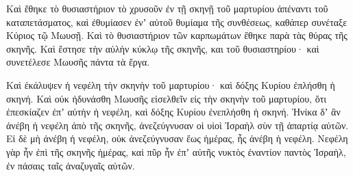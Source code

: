 {Καὶ ἔθηκε τὸ θυσιαστήριον τὸ χρυσοῦν ἐν τῇ σκηνῇ τοῦ μαρτυρίου ἀπέναντι τοῦ καταπετάσματος,
καὶ ἐθυμίασεν ἐνʼ αὐτοῦ θυμίαμα τῆς συνθέσεως, καθάπερ συνέταξε Κύριος τῷ Μωυσῇ.
Καὶ τὸ θυσιαστήριον τῶν καρπωμάτων ἔθηκε παρὰ τὰς θύρας τῆς σκηνῆς.
Καὶ ἔστησε τὴν αὐλὴν κύκλῳ τῆς σκηνῆς, και τοῦ θυσιαστηρίου· καὶ συνετέλεσε Μωυσῆς πάντα τὰ ἔργα.
\par }{\PP {}Καὶ ἐκάλυψεν ἡ νεφέλη τὴν σκηνὴν τοῦ μαρτυρίου· καὶ δόξης Κυρίου ἐπλήσθη ἡ σκηνή.
Καὶ οὐκ ἠδυνάσθη Μωυσῆς εἰσελθεῖν εἰς τὴν σκηνὴν τοῦ μαρτυρίου, ὅτι ἐπεσκίαζεν ἐπʼ αὐτὴν ἡ νεφέλη, καὶ δόξης Κυρίου ἐνεπλήσθη ἡ σκηνή.
Ἡνίκα δʼ ἂν ἀνέβη ἡ νεφέλη ἀπὸ τῆς σκηνῆς, ἀνεζεύγνυσαν οἱ υἱοὶ Ἰσραὴλ σὺν τῇ ἀπαρτίᾳ αὐτῶν.
Εἰ δὲ μὴ ἀνέβη ἡ νεφέλη, οὐκ ἀνεζεύγνυσαν ἕως ἡμέρας, ἧς ἀνέβη ἡ νεφέλη.
Νεφέλη γὰρ ἦν ἐπὶ τῆς σκηνῆς ἡμέρας, καὶ πῦρ ἦν ἐπʼ αὐτῆς νυκτὸς ἐναντίον παντὸς Ἰσραὴλ, ἐν πάσαις ταῖς ἀναζυγαῖς αὐτῶν.
\par }